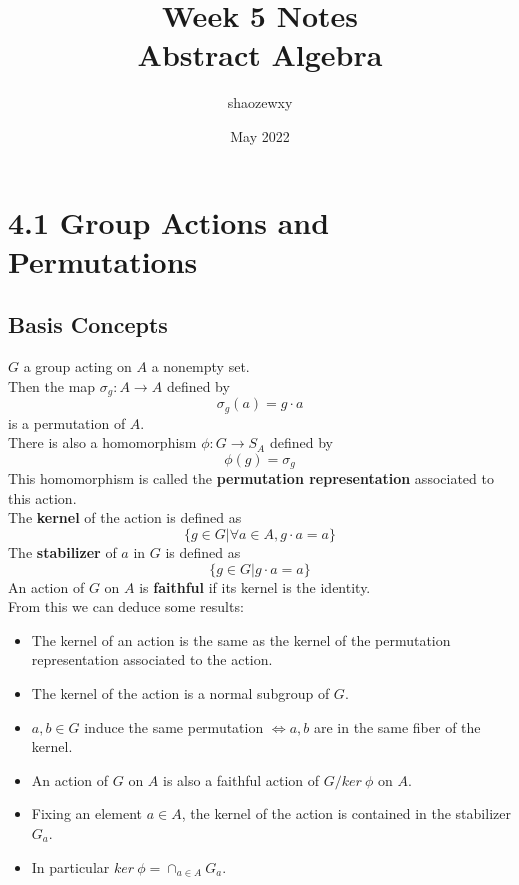\documentclass{article}
\title{Week 5 Notes\\
\large{Abstract Algebra}}
\author{shaozewxy }
\date{May 2022}
\begin{document}
\maketitle
\setcounter{secnumdepth}{0}
\section{4.1 Group Actions and Permutations}
\subsection{Basis Concepts}
$G$ a group acting on $A$ a nonempty set.\\
Then the map $\sigma_g:A \rightarrow A$ defined by
\begin{equation*}
    \sigma_g(a) = g\cdot a
\end{equation*}
is a permutation of $A$.\\
There is also a homomorphism $\phi:G \rightarrow S_A$ defined by
\begin{equation*}
    \phi(g) = \sigma_g
\end{equation*}
This homomorphism is called the \textbf{permutation representation} associated to this action.\\
The \textbf{kernel} of the action is defined as
\begin{equation*}
    \{g \in G|\forall a \in A, g\cdot a = a\}
\end{equation*}
The \textbf{stabilizer} of $a$ in $G$ is defined as
\begin{equation*}
    \{g \in G|g\cdot a = a\}
\end{equation*}
An action of $G$ on $A$ is \textbf{faithful} if its kernel is the identity.\\
From this we can deduce some results:
\begin{itemize}
\item The kernel of an action is the same as the kernel of the permutation representation associated to the action.
\item The kernel of the action is a normal subgroup of $G$.
\item $a, b \in G$ induce the same permutation $\iff a, b$ are in the same fiber of the kernel.
\item An action of $G$ on $A$ is also a faithful action of $G/ker\ \phi$ on $A$.
\item Fixing an element $a \in A$, the kernel of the action is contained in the stabilizer $G_a$.
\item In particular $ker\ \phi = \cap_{a \in A} G_a$.
\end{itemize}
\end{document}
